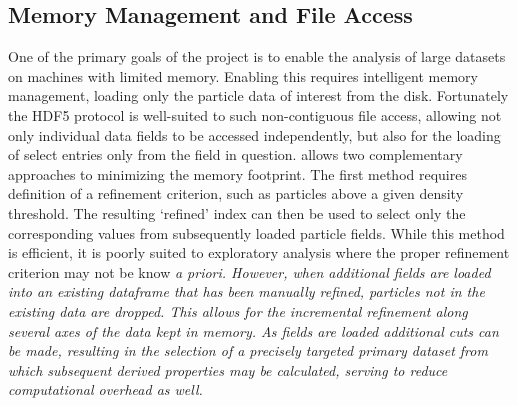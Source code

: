 \subsection{Memory Management and File Access}
\label{sec:fileIO}
One of the primary goals of the  project is to enable the analysis of large datasets on machines with limited memory.
Enabling this requires intelligent memory management, loading only the particle data of interest from the disk.
Fortunately the HDF5 protocol is well-suited to such non-contiguous file access, allowing not only individual data fields to be accessed independently, but also for the loading of select entries only from the field in question.
 allows two complementary approaches to minimizing the memory footprint.
The first method requires definition of a refinement criterion, such as particles above a given density threshold.
The resulting `refined' index can then be used to select only the corresponding values from subsequently loaded particle fields.
While this method is efficient, it is poorly suited to exploratory analysis where the proper refinement criterion may not be know \it{a priori}.
However, when additional fields are loaded into an existing  dataframe that has been manually refined, particles not in the existing data are dropped.
This allows for the incremental refinement along several axes of the data kept in memory.
As fields are loaded additional cuts can be made, resulting in the selection of a precisely targeted primary dataset from which subsequent derived properties may be calculated, serving to reduce computational overhead as well.